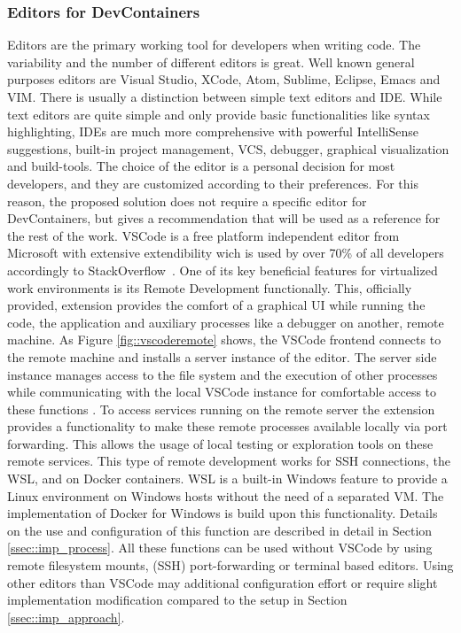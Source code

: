 \documentclass[12pt, a4paper]{article}
\begin{document}
        \subsubsection{Editors for DevContainers}
        Editors are the primary working tool for developers when writing code. The variability and the number of different editors is great. Well known general purposes editors are Visual Studio, XCode, Atom, Sublime, Eclipse, Emacs and VIM. There is usually a distinction between simple text editors and \acl{IDE}. While text editors are quite simple and only provide basic functionalities like syntax highlighting, \ac{IDE}s are much more comprehensive with powerful IntelliSense suggestions, built-in project management, \ac{VCS}, debugger, graphical visualization and build-tools. The choice of the editor is a personal decision for most developers, and they are customized according to their preferences. For this reason, the proposed solution does not require a specific editor for DevContainers, but gives a recommendation that will be used as a reference for the rest of the work.\newline
        \ac{VSCode} is a free platform independent editor from Microsoft with extensive extendibility wich is used by over 70\% of all developers accordingly to StackOverflow~\cite{stackoverflow2021}. One of its key beneficial features for virtualized work environments is its Remote Development functionally. This, officially provided, extension provides the comfort of a graphical \ac{UI} while running the code, the application and auxiliary processes like a debugger on another, remote machine. As Figure \ref{fig::vscoderemote} shows, the \ac{VSCode} frontend connects to the remote machine and installs a server instance of the editor. The server side instance manages access to the file system and the execution of other processes while communicating with the local \ac{VSCode} instance for comfortable access to these functions \cite{vscodedevcontainer}. To access services running on the remote server the extension provides a functionality to make these remote processes available locally via port forwarding. This allows the usage of local testing or exploration tools on these remote services. This type of remote development works for \ac{SSH} connections, the \ac{WSL}, and on Docker containers. \ac{WSL} is a built-in Windows feature to provide a Linux environment on Windows hosts without the need of a separated \ac{VM}. The implementation of Docker for Windows is build upon this functionality. Details on the use and configuration of this function are described in detail in Section \ref{ssec::imp_process}. All these functions can be used without \ac{VSCode} by using remote filesystem mounts, (\ac{SSH}) port-forwarding or terminal based editors. Using other editors than \ac{VSCode} may additional configuration effort or require slight implementation modification compared to the setup in Section \ref{ssec::imp_approach}.
\end{document}
